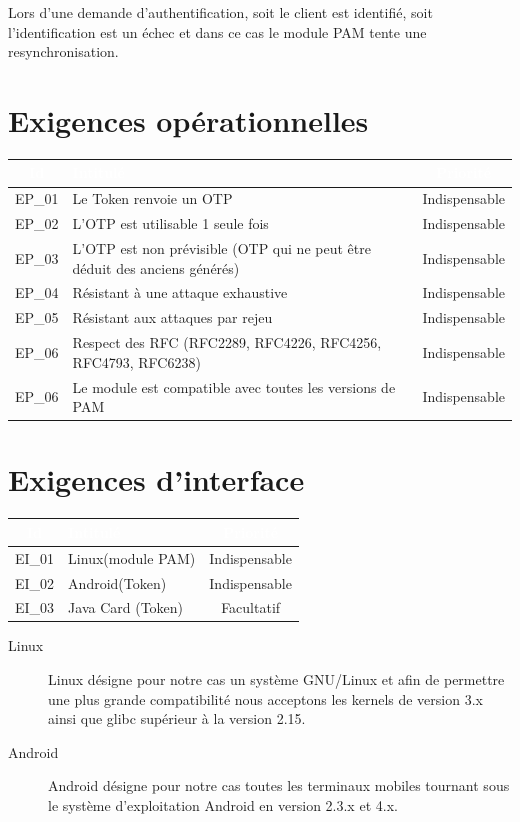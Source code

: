\documentclass{"../../res/univ-projet"}
\begin{document}
\vspace{0.5cm}

Lors d'une demande d'authentification, soit le client est identifié, soit l'identification est un échec et dans ce cas
le module PAM tente une resynchronisation.
\clearpage
\newpage
\section{Exigences opérationnelles}
\begin{tabular}{|c|l|c|}
    \hline
    \rowcolor{gray}
    \textcolor{white}{Id} & \textcolor{white}{Intitulé} & \textcolor{white}{Priorité}\\
    \hline
    EP\_01 & Le Token renvoie un OTP & Indispensable\\
    \hline
    EP\_02 & L'OTP est utilisable 1 seule fois & Indispensable\\
    \hline
    EP\_03 & L'OTP est non prévisible (OTP qui ne peut être déduit des anciens générés) & Indispensable\\
    \hline
    EP\_04 & Résistant à une attaque exhaustive & Indispensable\\
    \hline
    EP\_05 & Résistant aux attaques par rejeu & Indispensable\\
    \hline
    EP\_06 & Respect des RFC (RFC2289, RFC4226, RFC4256, RFC4793, RFC6238) & Indispensable\\
    \hline
    EP\_06 & Le module est compatible avec toutes les versions de PAM & Indispensable\\
    \hline
\end{tabular}

\section{Exigences d'interface}
\begin{tabular}{|c|l|c|}
    \hline
    \rowcolor{gray}
    \textcolor{white}{Id} & \textcolor{white}{Intitulé} & \textcolor{white}{Priorité}\\
    \hline
    EI\_01 & Linux(module PAM) & Indispensable\\
    \hline
    EI\_02 & Android(Token) & Indispensable\\
    \hline
    EI\_03 & Java Card (Token) & Facultatif\\
    \hline
\end{tabular}
\vspace{0.5cm}
\begin{description}
 \item[Linux] Linux désigne pour notre cas un système GNU/Linux et afin de permettre une plus grande compatibilité
 nous acceptons les kernels de version 3.x ainsi que glibc supérieur à la version 2.15.
 \item[Android] Android désigne pour notre cas toutes les terminaux mobiles tournant sous le système d'exploitation Android en version 2.3.x et 4.x.
\end{description}
\end{document}
